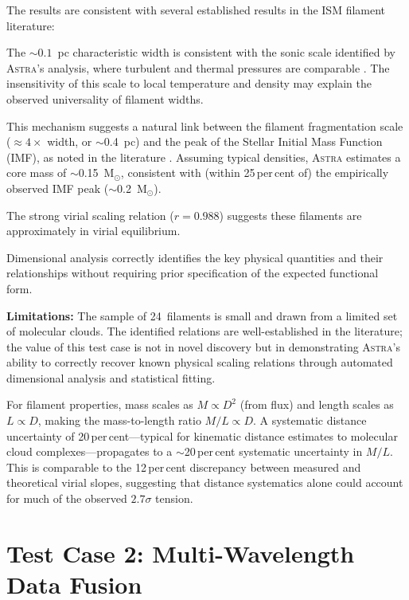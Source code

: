 \documentclass[usenatbib]{rasti}
\newcommand{\astra}{\textsc{Astra}\xspace}
\begin{document}
The results are consistent with several established results in the ISM filament literature:
\begin{description}
  \item The ${\sim}0.1$~pc characteristic width is consistent with the sonic scale identified by \astra's analysis, where turbulent and thermal pressures are comparable \citep{Andre2010}. The insensitivity of this scale to local temperature and density may explain the observed universality of filament widths.
  \item This mechanism suggests a natural link between the filament fragmentation scale ($\approx 4\times$ width, or $\sim$0.4~pc) and the peak of the Stellar Initial Mass Function (IMF), as noted in the literature \citep{Andre2010}. Assuming typical densities, \astra estimates a core mass of $\sim$0.15~M$_\odot$, consistent with (within 25\,per\,cent of) the empirically observed IMF peak ($\sim$0.2~M$_\odot$).
  \item The strong virial scaling relation ($r = 0.988$) suggests these filaments are approximately in virial equilibrium.
  \item Dimensional analysis correctly identifies the key physical quantities and their relationships without requiring prior specification of the expected functional form.
\end{description}

\textbf{Limitations:} The sample of 24~filaments is small and drawn from a limited set of molecular clouds.
The identified relations are well-established in the literature; the value of this test case is not in novel discovery but in demonstrating \astra's ability to correctly recover known physical scaling relations through automated dimensional analysis and statistical fitting.

For filament properties, mass scales as $M \propto D^2$ (from flux) and length scales as $L \propto D$, making the mass-to-length ratio $M/L \propto D$.
A systematic distance uncertainty of 20\,per\,cent---typical for kinematic distance estimates to molecular cloud complexes---propagates to a $\sim$20\,per\,cent systematic uncertainty in $M/L$.
This is comparable to the 12\,per\,cent discrepancy between measured and theoretical virial slopes, suggesting that distance systematics alone could account for much of the observed $2.7\sigma$ tension.

\section{Test Case 2: Multi-Wavelength Data Fusion}
\label{sec:tc2}
\end{document}

